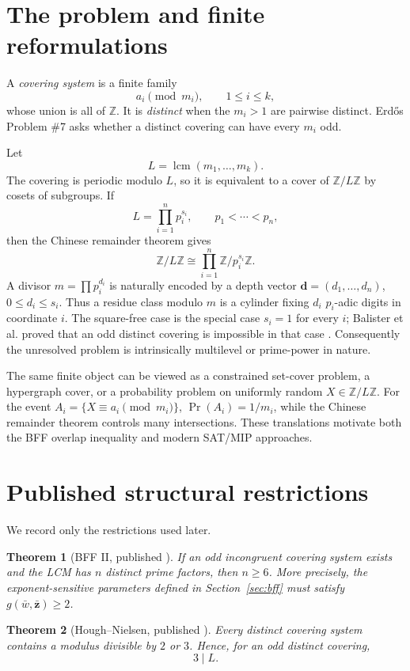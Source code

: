 \documentclass[11pt]{article}
\newtheorem{theorem}{Theorem}[section]
\theoremstyle{definition}
\newcommand{\Z}{\mathbb Z}
\DeclareMathOperator{\LCM}{lcm}
\begin{document}
\tableofcontents

\section{The problem and finite reformulations}

A \emph{covering system} is a finite family
\[
 a_i\pmod{m_i},\qquad 1\le i\le k,
\]
whose union is all of $\Z$.  It is \emph{distinct} when the $m_i>1$ are pairwise distinct.
Erd\H{o}s Problem \#7 asks whether a distinct covering can have every $m_i$ odd.

Let
\[
 L=\LCM(m_1,\dots,m_k).
\]
The covering is periodic modulo $L$, so it is equivalent to a cover of $\Z/L\Z$ by cosets of
subgroups.  If
\[
 L=\prod_{i=1}^{n}p_i^{s_i},\qquad p_1<\cdots<p_n,
\]
then the Chinese remainder theorem gives
\[
 \Z/L\Z\cong\prod_{i=1}^{n}\Z/p_i^{s_i}\Z.
\]
A divisor $m=\prod p_i^{d_i}$ is naturally encoded by a depth vector
$\mathbf d=(d_1,\dots,d_n)$, $0\le d_i\le s_i$.  Thus a residue class modulo $m$ is a cylinder
fixing $d_i$ $p_i$-adic digits in coordinate $i$.  The square-free case is the special case
$s_i=1$ for every $i$; Balister et al. proved that an odd distinct covering is impossible in
that case \cite{BalisterSquarefree2021}.  Consequently the unresolved problem is intrinsically
multilevel or prime-power in nature.

The same finite object can be viewed as a constrained set-cover problem, a hypergraph cover,
or a probability problem on uniformly random $X\in\Z/L\Z$.  For the event
$A_i=\{X\equiv a_i\pmod{m_i}\}$, $\Pr(A_i)=1/m_i$, while the Chinese remainder theorem controls
many intersections.  These translations motivate both the BFF overlap inequality and modern
SAT/MIP approaches.

\section{Published structural restrictions}

We record only the restrictions used later.

\begin{theorem}[BFF II, published \cite{BFF1987}]
If an odd incongruent covering system exists and the LCM has $n$ distinct prime factors, then
$n\ge6$.  More precisely, the exponent-sensitive parameters defined in Section~\ref{sec:bff}
must satisfy $g(\bar w,\bar{\mathbf z})\ge2$.
\end{theorem}

\begin{theorem}[Hough--Nielsen, published \cite{HoughNielsen2019}]
Every distinct covering system contains a modulus divisible by $2$ or $3$.
Hence, for an odd distinct covering,
\[
 3\mid L.
\]
\end{theorem}
\end{document}
